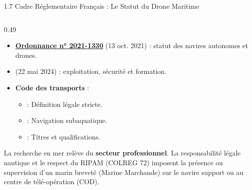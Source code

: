 \begin{frame}{1.7 Cadre Réglementaire Français : Le Statut du Drone Maritime}
  \begin{columns}[T]
    \begin{column}{0.49\textwidth}
      \begin{block}{}
        \scriptsize
        \begin{itemize}
          \item \href{https://www.legifrance.gouv.fr/jorf/id/JORFTEXT000044202140}{\underline{\textbf{Ordonnance n° 2021-1330}}} (13 oct. 2021) : statut des navires autonomes et drones.
          \item \href{https://www.legifrance.gouv.fr/jorf/id/JORFTEXT000049583905}{\underline{}} (22 mai 2024) : exploitation, sécurité et formation.
          \item \textbf{Code des transports} :
            \begin{itemize}\scriptsize
              \item \href{https://www.legifrance.gouv.fr/codes/article_lc/LEGIARTI000049585210}{\underline{}} : Définition légale stricte.
              \item \href{https://www.legifrance.gouv.fr/codes/article_lc/LEGIARTI000049585847}{\underline{}} : Navigation subaquatique.
              \item \href{https://www.legifrance.gouv.fr/codes/article_lc/LEGIARTI000049586745}{\underline{}} : Titres et qualifications.
            \end{itemize}
        \end{itemize}
      \end{block}

      \vspace{-0.3em}
      \begin{block}{}
        \scriptsize
        La recherche en mer relève du \textbf{secteur professionnel}. La responsabilité légale nautique et le respect du RIPAM (COLREG 72) imposent la présence ou supervision d'un marin breveté  (Marine Marchande) sur le navire support ou au centre de télé-opération (COD).
      \end{block}
    \end{column}


\end{columns}
\end{frame}
